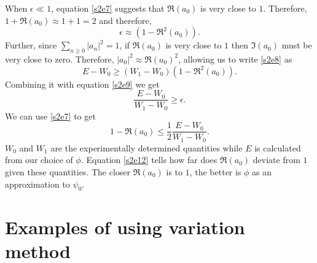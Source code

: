 \documentclass{article}
\numberwithin{equation}{section}
\begin{document}
When $\epsilon \ll 1$, equation \eqref{s2e7} suggests that $\Re(a_0)$ is 
very close to $1$. Therefore, $1 + \Re(a_0) \approx 1 + 1 = 2$ and 
therefore,
\begin{equation}\label{s2e9}
\epsilon \approx (1 - \Re^2(a_0)).
\end{equation}
Further, since $\sum_{n \ge 0}|a_n|^2 = 1$, if $\Re(a_0)$ is very close to 
$1$ then $\Im(a_0)$ must be very close to zero. Therefore, $|a_0|^2 \approx
\Re(a_0)^2$, allowing us to write \eqref{s2e8} as
\begin{equation}\label{s2e10}
E - W_0 \ge (W_1 - W_0)(1 - \Re^2(a_0)).
\end{equation}
Combining it with equation \eqref{s2e9} we get
\begin{equation}\label{s2e11}
\frac{E - W_0}{W_1 - W_0} \ge \epsilon.
\end{equation}
We can use \eqref{s2e7} to get 
\begin{equation}\label{s2e12}
1 - \Re(a_0) \le \frac{1}{2}\frac{E - W_0}{W_1 - W_0}.
\end{equation}
$W_0$ and $W_1$ are the experimentally determined quantities while $E$ is
calculated from our choice of $\phi$. Equation \eqref{s2e12} tells how far
does $\Re(a_0)$ deviate from $1$ given these quantities. The closer $\Re(a_0)$
is to $1$, the better is $\phi$ as an approximation to $\psi_0$.

\section{Examples of using variation method}\label{s3}
\end{document}
